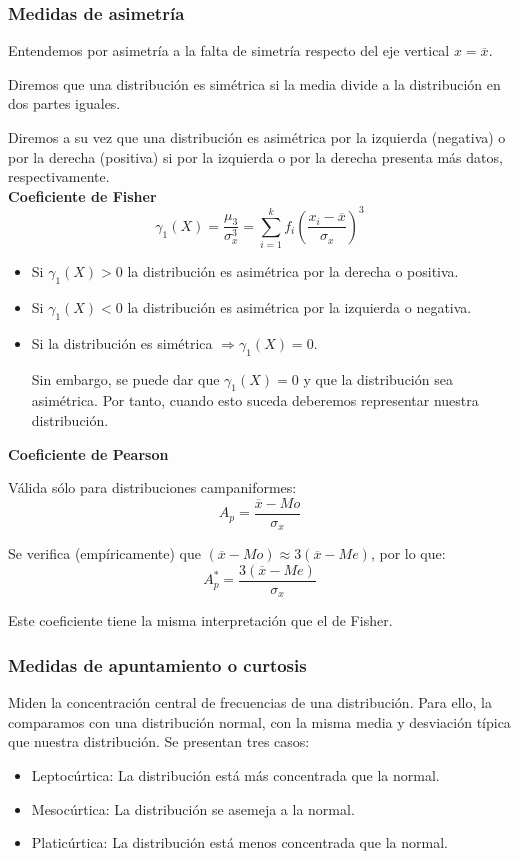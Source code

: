 \subsubsection{Medidas de asimetría}

Entendemos por asimetría a la falta de simetría respecto del eje vertical $x=\overline{x}$.

Diremos que una distribución es simétrica si la media divide a la distribución en dos partes iguales.

Diremos a su vez que una distribución es asimétrica por la izquierda (negativa) o por la derecha (positiva) si
por la izquierda o por la derecha presenta más datos, respectivamente.\\

\textbf{Coeficiente de Fisher}
$$\gamma_1(X) = \dfrac{\mu_3}{\sigma_x^3} = \sum_{i=1}^k f_i \left( \dfrac{x_i - \overline{x}}{\sigma_x} \right)^3$$

\begin{itemize}
    \item Si $\gamma_1(X) > 0$ la distribución es asimétrica por la derecha o positiva.
    \item Si $\gamma_1(X) < 0$ la distribución es asimétrica por la izquierda o negativa.
    \item Si la distribución es simétrica $\Rightarrow \gamma_1(X)=0$.

    Sin embargo, se puede dar que $\gamma_1(X)=0$ y que la distribución sea asimétrica. Por tanto, cuando esto suceda deberemos representar nuestra distribución.
\end{itemize}

\textbf{Coeficiente de Pearson}

Válida sólo para distribuciones campaniformes:
$$A_p = \dfrac{\overline{x} - Mo}{\sigma_x}$$

Se verifica (empíricamente) que $(\overline{x}-Mo) \approx 3(\overline{x}-Me)$, por lo que:
$$A_p^\ast = \dfrac{3(\overline{x} - Me)}{\sigma_x}$$

Este coeficiente tiene la misma interpretación que el de Fisher.


\subsubsection{Medidas de apuntamiento o curtosis}


Miden la concentración central de frecuencias de una distribución. Para ello, la comparamos con una distribución
normal, con la misma media y desviación típica que nuestra distribución.
Se presentan tres casos:
\begin{itemize}
    \item Leptocúrtica: La distribución está más concentrada que la normal.
    \item Mesocúrtica: La distribución se asemeja a la normal.
    \item Platicúrtica: La distribución está menos concentrada que la normal.
\end{itemize}

